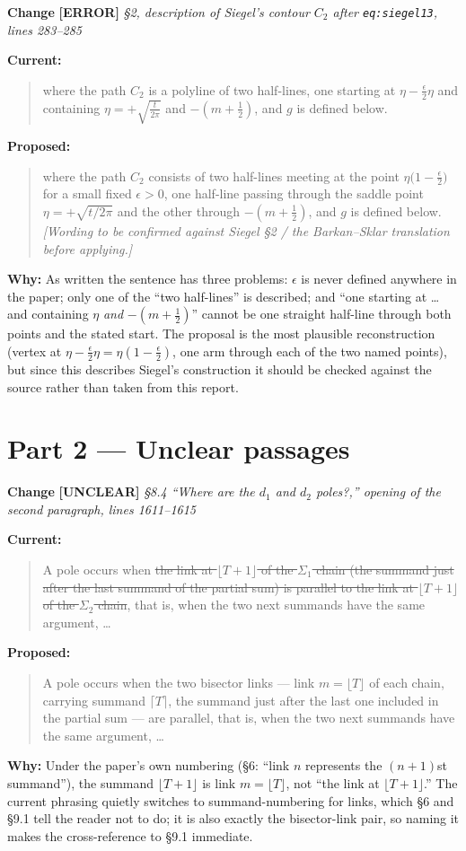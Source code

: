 \documentclass[11pt]{article}
\newcounter{chg}
\newcommand{\change}[3]{%
  \refstepcounter{chg}%
  \bigskip\par\noindent
  {\large\textbf{Change \thechg}}\quad
  {\color{#1}\textbf{[#2]}}\quad
  \textit{#3}\par\nobreak\smallskip}
\newenvironment{cur}{\par\noindent\textbf{Current:}\begin{quote}\color{delred}}{\end{quote}}
\newenvironment{prop}{\par\noindent\textbf{Proposed:}\begin{quote}\color{insblue}}{\end{quote}}
\newcommand{\why}[1]{\par\noindent\textbf{Why:} #1\par}
\begin{document}
\change{tagerr}{ERROR}{\S{}2, description of Siegel's contour $C_2$ after
\texttt{eq:siegel13}, lines 283--285}
\begin{cur}
where the path $C_2$ is a polyline of two half-lines, one starting at
$\eta-\tfrac{\epsilon}{2}\eta$ and containing $\eta=+\sqrt{\tfrac{t}{2\pi}}$
and $-(m+\tfrac12)$, and $g$ is defined below.
\end{cur}
\begin{prop}
where the path $C_2$ consists of two half-lines meeting at the point
$\eta\bigl(1-\tfrac{\epsilon}{2}\bigr)$ for a small fixed $\epsilon>0$, one
half-line passing through the saddle point $\eta=+\sqrt{t/2\pi}$ and the other
through $-(m+\tfrac12)$, and $g$ is defined below.
\emph{[Wording to be confirmed against Siegel \S2 / the Barkan--Sklar
translation before applying.]}
\end{prop}
\why{As written the sentence has three problems: $\epsilon$ is never defined
anywhere in the paper; only one of the ``two half-lines'' is described; and
``one starting at \ldots{} and containing $\eta$ \emph{and} $-(m+\tfrac12)$''
cannot be one straight half-line through both points and the stated start. The
proposal is the most plausible reconstruction (vertex at
$\eta-\tfrac{\epsilon}{2}\eta=\eta(1-\tfrac{\epsilon}{2})$, one arm through
each of the two named points), but since this describes Siegel's construction
it should be checked against the source rather than taken from this report.}

\section*{Part 2 --- Unclear passages}

\change{tagunc}{UNCLEAR}{\S{}8.4 ``Where are the $d_1$ and $d_2$ poles?,''
opening of the second paragraph, lines 1611--1615}
\begin{cur}
A pole occurs when \sout{the link at $\lfloor T+1\rfloor$ of the $\Sigma_1$
chain (the summand just after the last summand of the partial sum) is parallel
to the link at $\lfloor T+1\rfloor$ of the $\Sigma_2$ chain}, that is, when the
two next summands have the same argument, \ldots
\end{cur}
\begin{prop}
A pole occurs when the two bisector links --- link $m=\lfloor T\rfloor$ of each
chain, carrying summand $\lceil T\rceil$, the summand just after the last one
included in the partial sum --- are parallel, that is, when the two next
summands have the same argument, \ldots
\end{prop}
\why{Under the paper's own numbering (\S{}6: ``link $n$ represents the
$(n+1)$st summand''), the summand $\lfloor T+1\rfloor$ is link
$m=\lfloor T\rfloor$, not ``the link at $\lfloor T+1\rfloor$.'' The current
phrasing quietly switches to summand-numbering for links, which \S{}6 and
\S{}9.1 tell the reader not to do; it is also exactly the bisector-link pair,
so naming it makes the cross-reference to \S{}9.1 immediate.}
\end{document}
